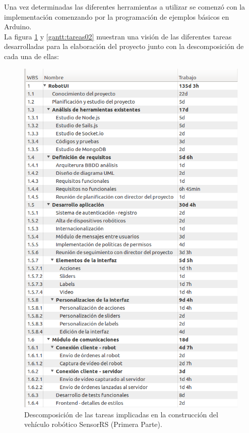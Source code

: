 Una vez determinadas las diferentes herramientas a utilizar se comenzó con la implementación comenzando por la programación de ejemplos básicos en Arduino.\\

La figura \ref{gantt:tareas01} y \ref{gantt:tareas02} muestran una visión de las diferentes tareas desarrolladas para la elaboración del proyecto junto con la descomposición de cada una de ellas:\\

\begin{figure}
  \begin{center}
    \includegraphics[scale=0.6]{imagenes/planificacion/descomposicion_tareas01.png}
  \end{center}
  \caption{Descomposición de las tareas implicadas en la construcción del vehículo robótico SensorRS (Primera Parte).}
  \label{gantt:tareas01}
\end{figure}

